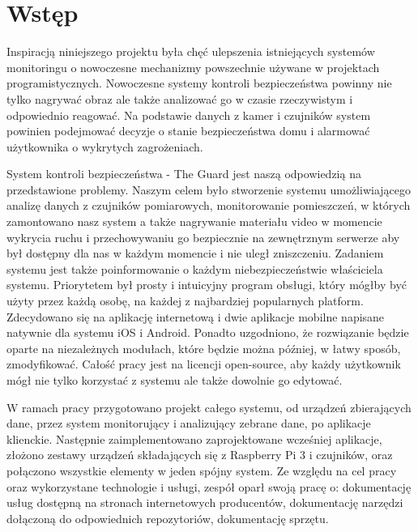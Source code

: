 \chapter{Wstęp}
Inspiracją niniejszego projektu była chęć ulepszenia istniejących systemów monitoringu o nowoczesne mechanizmy powszechnie używane w projektach programistycznych.
Nowoczesne systemy kontroli bezpieczeństwa powinny nie tylko nagrywać obraz ale także analizować go w czasie rzeczywistym i odpowiednio reagować. Na podstawie danych z kamer i czujników system powinien podejmować decyzje o stanie bezpieczeństwa domu i alarmować użytkownika o wykrytych zagrożeniach.

System kontroli bezpieczeństwa - The Guard jest naszą odpowiedzią na przedstawione problemy. Naszym celem było stworzenie systemu umożliwiającego analizę danych z czujników pomiarowych, monitorowanie pomieszczeń, w których zamontowano nasz system a także nagrywanie materiału video w momencie wykrycia ruchu i przechowywaniu go bezpiecznie na zewnętrznym serwerze aby był dostępny dla nas w każdym momencie i nie uległ zniszczeniu. Zadaniem systemu jest także poinformowanie o każdym niebezpieczeństwie właściciela systemu. Priorytetem był prosty i intuicyjny program obsługi, który mógłby być użyty przez każdą osobę, na każdej z najbardziej popularnych platform. Zdecydowano się na aplikację internetową i dwie aplikacje mobilne napisane natywnie dla systemu iOS i Android. Ponadto uzgodniono, że rozwiązanie będzie oparte na niezależnych modułach, które będzie można później, w łatwy sposób, zmodyfikować. Całość pracy jest na licencji open-source, aby każdy użytkownik mógł nie tylko korzystać z systemu ale także dowolnie go edytować.

W ramach pracy przygotowano projekt całego systemu, od urządzeń zbierających dane, przez system monitorujący i analizujący zebrane dane, po aplikacje klienckie. Następnie zaimplementowano zaprojektowane wcześniej aplikacje, złożono zestawy urządzeń składających się z Raspberry Pi 3 i czujników, oraz połączono wszystkie elementy w jeden spójny system.
Ze względu na cel pracy oraz wykorzystane technologie i usługi, zespół oparł swoją pracę o: dokumentację usług dostępną na stronach internetowych producentów, dokumentację narzędzi dołączoną do odpowiednich repozytoriów, dokumentację sprzętu.


